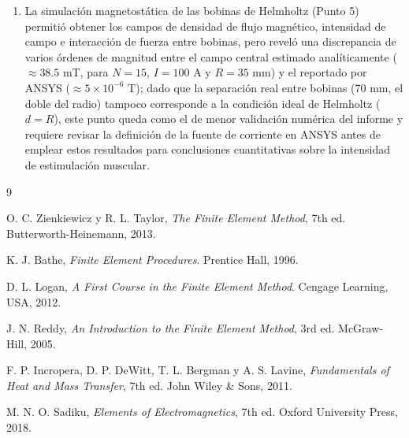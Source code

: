 \documentclass[conference]{IEEEtran}
\begin{document}
\begin{enumerate}
    \item La simulación magnetostática de las bobinas de Helmholtz (Punto 5) permitió obtener los campos de densidad de flujo magnético, intensidad de campo e interacción de fuerza entre bobinas, pero reveló una discrepancia de varios órdenes de magnitud entre el campo central estimado analíticamente ($\approx38.5$ mT, para $N=15$, $I=100$ A y $R=35$ mm) y el reportado por ANSYS ($\approx5\times10^{-6}$ T); dado que la separación real entre bobinas (70 mm, el doble del radio) tampoco corresponde a la condición ideal de Helmholtz ($d=R$), este punto queda como el de menor validación numérica del informe y requiere revisar la definición de la fuente de corriente en ANSYS antes de emplear estos resultados para conclusiones cuantitativas sobre la intensidad de estimulación muscular.
\end{enumerate}

\begin{thebibliography}{9}

O. C. Zienkiewicz y R. L. Taylor,
\textit{The Finite Element Method}, 7th ed.
Butterworth-Heinemann, 2013.

K. J. Bathe,
\textit{Finite Element Procedures}.
Prentice Hall, 1996.

D. L. Logan,
\textit{A First Course in the Finite Element Method}.
Cengage Learning, USA, 2012.

J. N. Reddy,
\textit{An Introduction to the Finite Element Method}, 3rd ed.
McGraw-Hill, 2005.

F. P. Incropera, D. P. DeWitt, T. L. Bergman y A. S. Lavine,
\textit{Fundamentals of Heat and Mass Transfer}, 7th ed.
John Wiley \& Sons, 2011.

M. N. O. Sadiku,
\textit{Elements of Electromagnetics}, 7th ed.
Oxford University Press, 2018.

\end{thebibliography}
\end{document}
